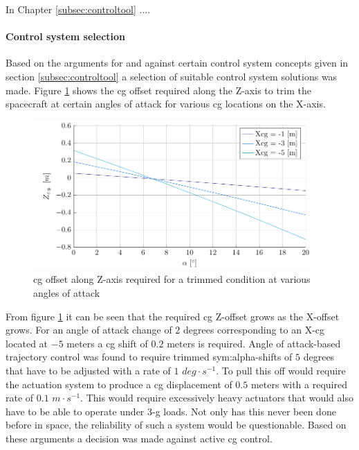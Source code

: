 
In Chapter \ref{subsec:controltool} ....






\paragraph{Control system selection}
Based on the arguments for and against certain control system concepts given in section \ref{subsec:controltool} a selection of suitable control system solutions was made. Figure \ref{fig:cgoffset} shows the \gls{cg} offset required along the Z-axis to trim the spacecraft at certain angles of attack for various \gls{cg} locations on the X-axis. 
\begin{figure}[h]
	\centering
	\includegraphics[width=0.95\textwidth]{./Figure/control/moment}
	\caption{\gls{cg} offset along Z-axis required for a trimmed condition at various angles of attack}
	\label{fig:cgoffset}
\end{figure}
From figure \ref{fig:cgoffset} it can be seen that the required \gls{cg} Z-offset grows as the X-offset grows. For an angle of attack change of $2$ degrees corresponding to an X-\gls{cg} located at $-5$ meters a \gls{cg} shift of $0.2$ meters is required. Angle of attack-based trajectory control was found to require trimmed \gls{sym:alpha}-shifts of $5$ degrees that have to be adjusted with a rate of $1$ $deg \cdot s^{-1}$. To pull this off would require the actuation system to produce a \gls{cg} displacement of $0.5$ meters with a required rate of $0.1$ $m \cdot s^{-1}$. This would require excessively heavy actuators that would also have to be able to operate under 3-g loads. Not only has this never been done before in space, the reliability of such a system would be questionable. Based on these arguments a decision was made against active \gls{cg} control.\\
